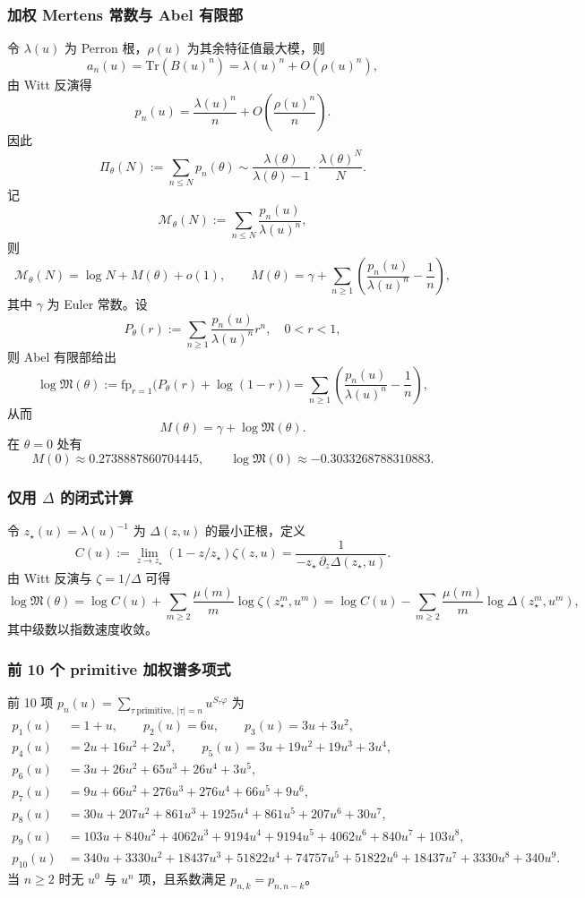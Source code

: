 \subsubsection{加权 Mertens 常数与 Abel 有限部}\label{app:mertens-weighted}
令 $\lambda(u)$ 为 Perron 根，$\rho(u)$ 为其余特征值最大模，则
\[
a_n(u)=\mathrm{Tr}(B(u)^n)=\lambda(u)^n+O(\rho(u)^n),
\]
由 Witt 反演得
\[
p_n(u)=\frac{\lambda(u)^n}{n}+O\!\left(\frac{\rho(u)^n}{n}\right).
\]
因此
\[
\Pi_\theta(N):=\sum_{n\le N}p_n(\theta)\sim \frac{\lambda(\theta)}{\lambda(\theta)-1}\cdot\frac{\lambda(\theta)^N}{N}.
\]
记
\[
\mathcal{M}_\theta(N):=\sum_{n\le N}\frac{p_n(u)}{\lambda(u)^n},
\]
则
\[
\mathcal{M}_\theta(N)=\log N+M(\theta)+o(1),
\qquad
M(\theta)=\gamma+\sum_{n\ge 1}\left(\frac{p_n(u)}{\lambda(u)^n}-\frac{1}{n}\right),
\]
其中 $\gamma$ 为 Euler 常数。设
\[
P_\theta(r):=\sum_{n\ge 1}\frac{p_n(u)}{\lambda(u)^n}r^n,\quad 0<r<1,
\]
则 Abel 有限部给出
\[
\log\mathfrak{M}(\theta):=\mathrm{fp}_{r=1}\bigl(P_\theta(r)+\log(1-r)\bigr)
=\sum_{n\ge 1}\left(\frac{p_n(u)}{\lambda(u)^n}-\frac{1}{n}\right),
\]
从而
\[
M(\theta)=\gamma+\log\mathfrak{M}(\theta).
\]
在 $\theta=0$ 处有
\[
M(0)\approx 0.2738887860704445,\qquad
\log\mathfrak{M}(0)\approx -0.3033268788310883.
\]

\subsubsection{仅用 \texorpdfstring{$\Delta$}{Delta} 的闭式计算}\label{app:delta-only}
令 $z_\star(u)=\lambda(u)^{-1}$ 为 $\Delta(z,u)$ 的最小正根，定义
\[
C(u):=\lim_{z\to z_\star}(1-z/z_\star)\zeta(z,u)=\frac{1}{-z_\star\,\partial_z\Delta(z_\star,u)}.
\]
由 Witt 反演与 $\zeta=1/\Delta$ 可得
\[
\log\mathfrak{M}(\theta)
=\log C(u)+\sum_{m\ge 2}\frac{\mu(m)}{m}\log\zeta(z_\star^m,u^m)
=\log C(u)-\sum_{m\ge 2}\frac{\mu(m)}{m}\log\Delta(z_\star^m,u^m),
\]
其中级数以指数速度收敛。

\subsubsection{前 10 个 primitive 加权谱多项式}\label{app:weighted-primitive-table}
前 10 项 $p_n(u)=\sum_{\tau\ \mathrm{primitive},\,|\tau|=n}u^{S_\tau\varphi}$ 为
\[
\begin{aligned}
p_1(u)&=1+u,\qquad
p_2(u)=6u,\qquad
p_3(u)=3u+3u^2,\\
p_4(u)&=2u+16u^2+2u^3,\qquad
p_5(u)=3u+19u^2+19u^3+3u^4,\\
p_6(u)&=3u+26u^2+65u^3+26u^4+3u^5,\\
p_7(u)&=9u+66u^2+276u^3+276u^4+66u^5+9u^6,\\
p_8(u)&=30u+207u^2+861u^3+1925u^4+861u^5+207u^6+30u^7,\\
p_9(u)&=103u+840u^2+4062u^3+9194u^4+9194u^5+4062u^6+840u^7+103u^8,\\
p_{10}(u)&=340u+3330u^2+18437u^3+51822u^4+74757u^5+51822u^6+18437u^7+3330u^8+340u^9.
\end{aligned}
\]
当 $n\ge 2$ 时无 $u^0$ 与 $u^n$ 项，且系数满足 $p_{n,k}=p_{n,n-k}$。

